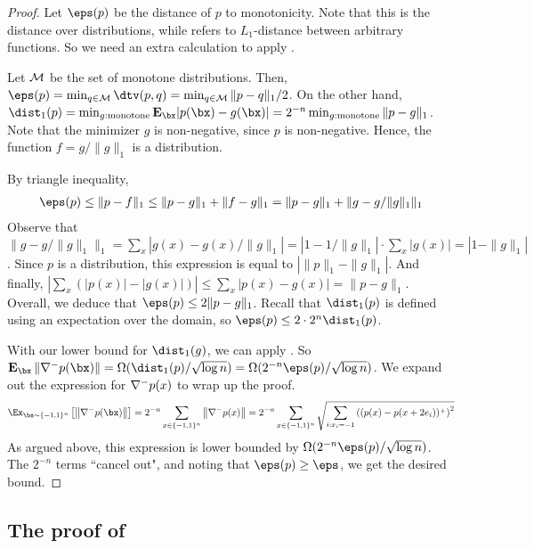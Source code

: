 \begin{proof} Let $\eps(p)$ be the distance of $p$ to monotonicity. Note that this is the distance
over distributions, while  refers to $L_1$-distance between arbitrary functions.
So we need an extra calculation to apply .

Let ${\cal M}$ be the set of monotone distributions. Then, $\eps(p) = \min_{q \in \cM} \dtv(p,q)
= \min_{q \in \cM} \|p-q\|_1/2$. On the other hand, $\dist_1(p) = \min_{g: \textrm{monotone}} \Exp_{\bx}|p(\bx) - g(\bx)|
= 2^{-n} \min_{g: \textrm{monotone}} \|p-g\|_1$. Note that the minimizer $g$ is non-negative, since $p$
is non-negative. Hence, the function $f = g/\|g\|_1$ is a distribution. 

By triangle inequality,
\begin{eqnarray*}
\eps(p) \leq \|p - f\|_1 \leq \|p-g\|_1 + \|f-g\|_1 = \|p-g\|_1 + \|g - g/\|g\|_1 \|_1
\end{eqnarray*}
Observe that $\|g - g/\|g\|_1 \|_1 = \sum_x |g(x) - g(x)/\|g\|_1| = |1 - 1/\|g\|_1| \cdot \sum_x |g(x)|
= | 1 - \|g\|_1|$. Since $p$ is a distribution, this expression is equal to $| \|p\|_1 - \|g\|_1|$.
And finally, $| \sum_x (|p(x)| - |g(x)|)| \leq \sum_x |p(x) - g(x)| = \|p-g\|_1$. 
Overall, we deduce that $\eps(p) \leq 2\|p-g\|_1$. Recall that $\dist_1(p)$ is defined
using an expectation over the domain, so $\eps(p) \leq 2 \cdot 2^n \dist_1(p)$. 

With our lower bound for $\dist_1(g)$, we can apply . 
So $\Exp_{\bx} \norm{\grad^-p(\bx)} = \Omega(\dist_1(p)/\sqrt{\log n}) = \Omega(2^{-n} \eps(p)/\sqrt{\log n})$.
We expand out the expression for $\nabla^-p(x)$ to wrap up the proof.
\begin{eqnarray*}
\Ex_{\bx\sim\{-1,1\}^n}\left[ \norm{\grad^-p(\bx)} \right] = 2^{-n} \sum_{x \in \{-1,1\}^n} \norm{\grad^-p(x)}
= 2^{-n}  \sum_{x \in \{-1,1\}^n} \sqrt{\sum_{i:x_i = -1} \left( (p(x) - p(x+2e_i) )^+ \right)^2}
\end{eqnarray*}
As argued above, this expression is lower bounded by $\Omega(2^{-n} \eps(p)/\sqrt{\log n})$.
The $2^{-n}$ terms ``cancel out", and noting that $\eps(p) \geq \eps$, we get the desired bound.
\end{proof}


\subsection{The proof of } \label{sec:proof-tal}

